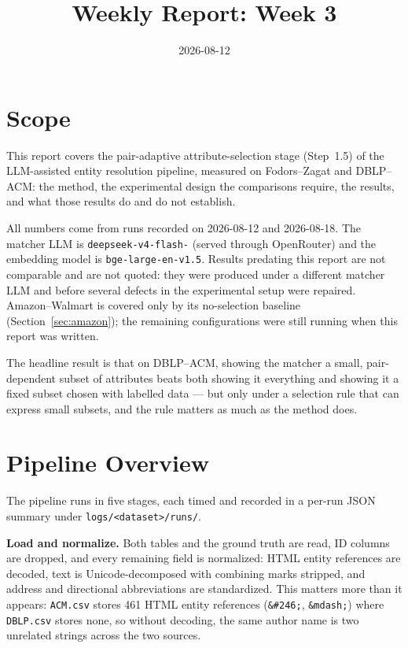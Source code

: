 \documentclass[11pt]{article}
\title{Weekly Report: Week 3}
\author{}
\date{2026-08-12}
\begin{document}
\maketitle

\section{Scope}

This report covers the pair-adaptive attribute-selection stage (Step~1.5) of the
LLM-assisted entity resolution pipeline, measured on Fodors--Zagat and DBLP--ACM: the
method, the experimental design the comparisons require, the results, and what those
results do and do not establish.

All numbers come from runs recorded on 2026-08-12 and 2026-08-18. The matcher LLM is
\texttt{deepseek-\allowbreak v4-\allowbreak flash-} (served through
OpenRouter) and the embedding model is
\texttt{bge-\allowbreak large-\allowbreak en-\allowbreak v1.5}. Results predating this
report are not comparable and are not quoted: they were produced under a different matcher
LLM and before several defects in the experimental setup were repaired. Amazon--Walmart is
covered only by its no-selection baseline (Section~\ref{sec:amazon}); the remaining
configurations were still running when this report was written.

The headline result is that on DBLP--ACM, showing the matcher a small, pair-dependent
subset of attributes beats both showing it everything and showing it a fixed subset chosen
with labelled data --- but only under a selection rule that can express small subsets, and
the rule matters as much as the method does.

\section{Pipeline Overview}

The pipeline runs in five stages, each timed and recorded in a per-run JSON summary under
\texttt{logs/<dataset>/runs/}.

\textbf{Load and normalize.} Both tables and the ground truth are read, ID columns are
dropped, and every remaining field is normalized: HTML entity references are decoded, text
is Unicode-decomposed with combining marks stripped, and address and directional
abbreviations are standardized. This matters more than it appears: \texttt{ACM.csv} stores
461 HTML entity references (\texttt{\&\#246;}, \texttt{\&mdash;}) where \texttt{DBLP.csv}
stores none, so without decoding, the same author name is two unrelated strings across the
two sources.
\end{document}
